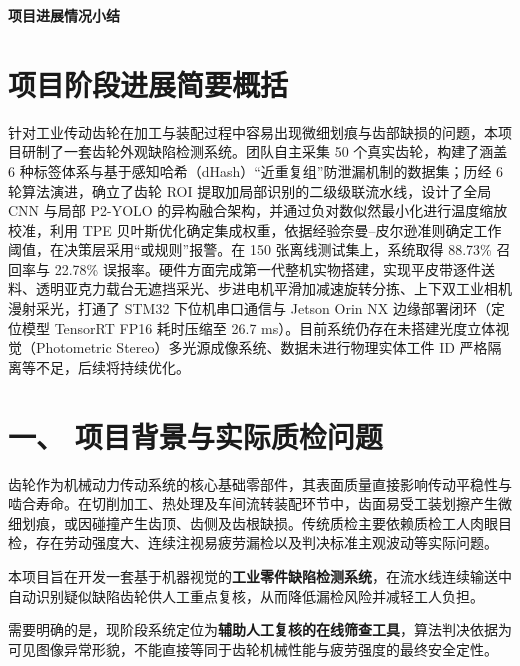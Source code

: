 
\begin{center}
{\bfseries 项目进展情况小结\par}
\end{center}

\section*{项目阶段进展简要概括}

针对工业传动齿轮在加工与装配过程中容易出现微细划痕与齿部缺损的问题，本项目研制了一套齿轮外观缺陷检测系统。团队自主采集 50 个真实齿轮，构建了涵盖 6 种标签体系与基于感知哈希（dHash）“近重复组”防泄漏机制的数据集；历经 6 轮算法演进，确立了齿轮 ROI 提取加局部识别的二级级联流水线，设计了全局 CNN 与局部 P2-YOLO 的异构融合架构，并通过负对数似然最小化进行温度缩放校准，利用 TPE 贝叶斯优化确定集成权重，依据经验奈曼–皮尔逊准则确定工作阈值，在决策层采用“或规则”报警。在 150 张离线测试集上，系统取得 88.73\% 召回率与 22.78\% 误报率。硬件方面完成第一代整机实物搭建，实现平皮带逐件送料、透明亚克力载台无遮挡采光、步进电机平滑加减速旋转分拣、上下双工业相机漫射采光，打通了 STM32 下位机串口通信与 Jetson Orin NX 边缘部署闭环（定位模型 TensorRT FP16 耗时压缩至 26.7 ms）。目前系统仍存在未搭建光度立体视觉（Photometric Stereo）多光源成像系统、数据未进行物理实体工件 ID 严格隔离等不足，后续将持续优化。

\section*{一、 项目背景与实际质检问题}

齿轮作为机械动力传动系统的核心基础零部件，其表面质量直接影响传动平稳性与啮合寿命。在切削加工、热处理及车间流转装配环节中，齿面易受工装划擦产生微细划痕，或因碰撞产生齿顶、齿侧及齿根缺损。传统质检主要依赖质检工人肉眼目检，存在劳动强度大、连续注视易疲劳漏检以及判决标准主观波动等实际问题。

本项目旨在开发一套基于机器视觉的\textbf{工业零件缺陷检测系统}，在流水线连续输送中自动识别疑似缺陷齿轮供人工重点复核，从而降低漏检风险并减轻工人负担。

需要明确的是，现阶段系统定位为\textbf{辅助人工复核的在线筛查工具}，算法判决依据为可见图像异常形貌，不能直接等同于齿轮机械性能与疲劳强度的最终安全定性。


